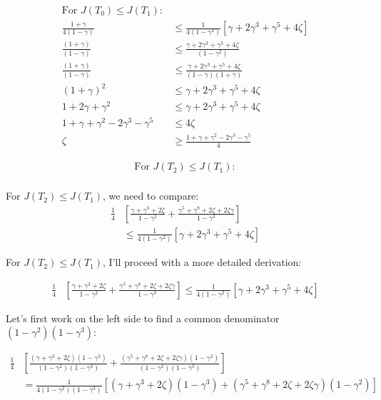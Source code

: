 \begin{align}
\text{For } J(T_0) \leq J(T_1): \\
\frac{1 + \gamma}{4(1-\gamma)} &\leq \frac{1}{4(1-\gamma^2)} \left[\gamma + 2\gamma^3 + \gamma^5 + 4\zeta\right] \\
\frac{(1 + \gamma)}{(1-\gamma)} &\leq \frac{\gamma + 2\gamma^3 + \gamma^5 + 4\zeta}{(1-\gamma^2)} \\
\frac{(1 + \gamma)}{(1-\gamma)} &\leq \frac{\gamma + 2\gamma^3 + \gamma^5 + 4\zeta}{(1-\gamma)(1+\gamma)} \\
(1 + \gamma)^2 &\leq \gamma + 2\gamma^3 + \gamma^5 + 4\zeta \\
1 + 2\gamma + \gamma^2 &\leq \gamma + 2\gamma^3 + \gamma^5 + 4\zeta \\
1 + \gamma + \gamma^2 - 2\gamma^3 - \gamma^5 &\leq 4\zeta \\
\zeta &\geq \frac{1 + \gamma + \gamma^2 - 2\gamma^3 - \gamma^5}{4}
\end{align}

\begin{align}
\text{For } J(T_2) \leq J(T_1): \\
\end{align}

For $J(T_2) \leq J(T_1)$, we need to compare:
\begin{align}
\frac{1}{4} &\left[\frac{\gamma + \gamma^3 + 2\zeta}{1-\gamma^2} + \frac{\gamma^5 + \gamma^8 + 2\zeta + 2\zeta\gamma}{1-\gamma^3}\right] \\
&\leq \frac{1}{4(1-\gamma^2)} \left[\gamma + 2\gamma^3 + \gamma^5 + 4\zeta\right]
\end{align}

For $J(T_2) \leq J(T_1)$, I'll proceed with a more detailed derivation:

\begin{align}
\frac{1}{4} &\left[\frac{\gamma + \gamma^3 + 2\zeta}{1-\gamma^2} + \frac{\gamma^5 + \gamma^8 + 2\zeta + 2\zeta\gamma}{1-\gamma^3}\right] \leq \frac{1}{4(1-\gamma^2)} \left[\gamma + 2\gamma^3 + \gamma^5 + 4\zeta\right]
\end{align}

Let's first work on the left side to find a common denominator $(1-\gamma^2)(1-\gamma^3)$:

\begin{align}
\frac{1}{4} &\left[\frac{(\gamma + \gamma^3 + 2\zeta)(1-\gamma^3)}{(1-\gamma^2)(1-\gamma^3)} + \frac{(\gamma^5 + \gamma^8 + 2\zeta + 2\zeta\gamma)(1-\gamma^2)}{(1-\gamma^2)(1-\gamma^3)}\right] \\
&= \frac{1}{4(1-\gamma^2)(1-\gamma^3)}\left[(\gamma + \gamma^3 + 2\zeta)(1-\gamma^3) + (\gamma^5 + \gamma^8 + 2\zeta + 2\zeta\gamma)(1-\gamma^2)\right]
\end{align}

